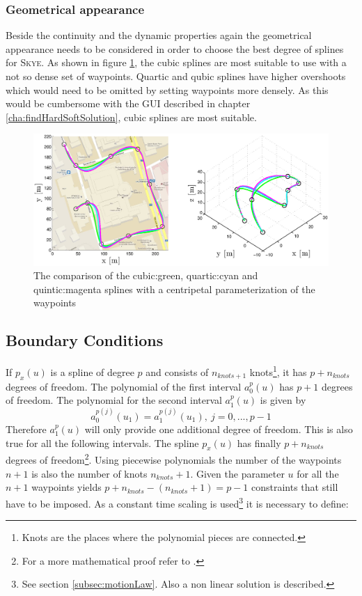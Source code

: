 \subsubsection{Geometrical appearance}
Beside the continuity and the dynamic properties again the geometrical appearance needs to be considered in order to choose the best degree of splines for \textsc{Skye}. As shown in figure \ref{fig:degreeCentripetal}, the cubic splines are most suitable to use with a not so dense set of waypoints. Quartic and qubic splines have higher overshoots which would need to be omitted by setting waypoints more densely. As this would be cumbersome with the GUI described in chapter \ref{cha:findHardSoftSolution}, cubic splines are most suitable. 

\begin{figure}[H]
	\centering
    \includegraphics[width = \textwidth]{graphics/DegreeCentripetal_road_agile.eps}
  \caption{The comparison of the cubic:green, quartic:cyan and quintic:magenta splines with a centripetal parameterization of the waypoints}
  \label{fig:degreeCentripetal}
\end{figure} 






\subsection{Boundary Conditions}
\label{subsec:boundary conditions}

If $p_x(u)$ is a spline of degree $p$ and consists of $n_{knots+1}$ knots\footnote{Knots are the places where the polynomial pieces are connected.}, it has $p+n_{knots}$ degrees of freedom. The polynomial of the first interval $a_0^p(u)$ has $p+1$ degrees of freedom. The polynomial for the second interval $a_1^p(u)$ is given by
\begin{equation*}
a_0^{p(j)}(u_1)=a_1^{p(j)}(u_1),~j=0,...,p-1
\end{equation*}
Therefore $a_1^p(u)$ will only provide one additional degree of freedom. This is also true for all the following intervals. The spline $p_x(u)$ has finally $p+n_{knots}$ degrees of freedom\footnote{For a more mathematical proof refer to \cite{dahmen}.}. Using piecewise polynomials the number of the waypoints $n+1$ is also the number of knots $n_{knots}+1$. Given the parameter $u$ for all the $n+1$ waypoints yields $p+n_{knots}-(n_{knots}+1) = p-1$ constraints that still have to be imposed. As a constant time scaling is used\footnote{ See section \ref{subsec:motionLaw}. Also a non linear solution is described.} it is necessary to define:

